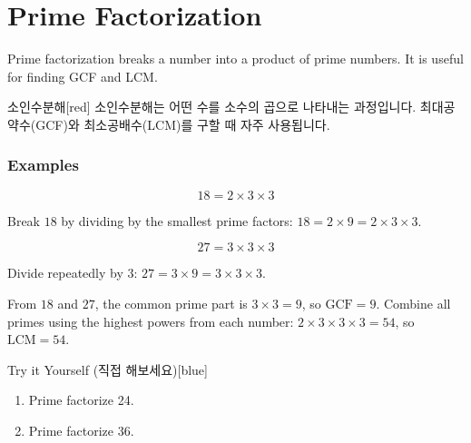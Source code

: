 \documentclass[12pt]{book}
\begin{document}
  \twosidedpaper
  \section{Prime Factorization}

  Prime factorization breaks a number into a product of prime numbers.  
  It is useful for finding GCF and LCM.  


  \begin{flexbox}{소인수분해}[red]
  소인수분해는 어떤 수를 소수의 곱으로 나타내는 과정입니다.  
  최대공약수(GCF)와 최소공배수(LCM)를 구할 때 자주 사용됩니다.  
  \end{flexbox}

  \subsubsection*{Examples}

  \[
  18 = 2 \times 3 \times 3
  \]

  Break $18$ by dividing by the smallest prime factors: $18=2\times9=2\times3\times3$.



  \[
  27 = 3 \times 3 \times 3
  \]

  Divide repeatedly by $3$: $27=3\times9=3\times3\times3$.



  From $18$ and $27$, the common prime part is $3\times3=9$, so $\mathrm{GCF}=9$.  
  Combine all primes using the highest powers from each number: $2\times3\times3\times3=54$, so $\mathrm{LCM}=54$.


  \begin{flexbox}{Try it Yourself (직접 해보세요)}[blue]
  \begin{enumerate}
    \item Prime factorize 24. \vspace*{20pt}
    \item Prime factorize 36. \vspace*{20pt}
  \end{enumerate}
  \end{flexbox}
\end{document}
